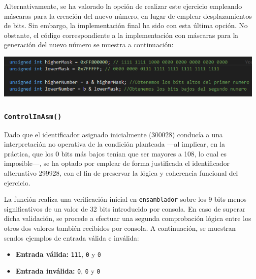 \documentclass[11pt,a4paper]{article}
\begin{document}
\noindent Alternativamente, se ha valorado la opción de realizar este ejercicio empleando máscaras para la creación del nuevo número, en lugar de emplear desplazamientos de bits. Sin embargo, la implementación final ha sido con esta última opción. No obstante, el código correspondiente a la implementación con máscaras para la generación del nuevo número se muestra a continuación: \vspace{2ex}
\begin{center}
  \includegraphics[width=1\textwidth]{alternativaPablo.png}
\end{center}

\vspace{3ex}

\subsubsection{\texttt{ControlInAsm()}}
\textcolor{naranjaDuro}{Dado que el identificador asignado inicialmente (300028) conducía a una interpretación no operativa de la condición planteada —al implicar, en la práctica, que los 0 bits más bajos tenían que ser mayores a 108, lo cual es imposible—, se ha optado por emplear de forma justificada el identificador alternativo 299928, con el fin de preservar la lógica y coherencia funcional del ejercicio.} \vspace{2ex}

\noindent La función realiza una verificación inicial en \texttt{ensamblador} sobre los 9 bits menos significativos de un valor de 32 bits introducido por consola. En caso de superar dicha validación, se procede a efectuar una segunda comprobación lógica entre los otros dos valores también recibidos por consola. A continuación, se muestran sendos ejemplos de entrada válida e inválida:
\begin{itemize}
  \item \textbf{Entrada válida:} \texttt{111}, \texttt{0} y \texttt{0}
  \item \textbf{Entrada inválida:} \texttt{0}, \texttt{0} y \texttt{0}
\end{itemize}
\vspace{3ex}
\end{document}
